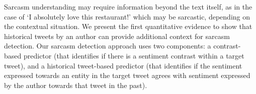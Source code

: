 Sarcasm understanding may require information beyond the text itself, as in the case of `I absolutely love this restaurant!' which may be sarcastic, depending on the contextual situation. We present the first quantitative evidence to show that historical tweets by an author can provide additional context for sarcasm detection. Our sarcasm detection approach uses two components: a contrast-based predictor (that identifies if there is a sentiment contrast within a target tweet), and a historical tweet-based predictor (that identifies if the sentiment expressed towards an entity in  the target tweet agrees with sentiment expressed by the author towards that tweet in the past).

